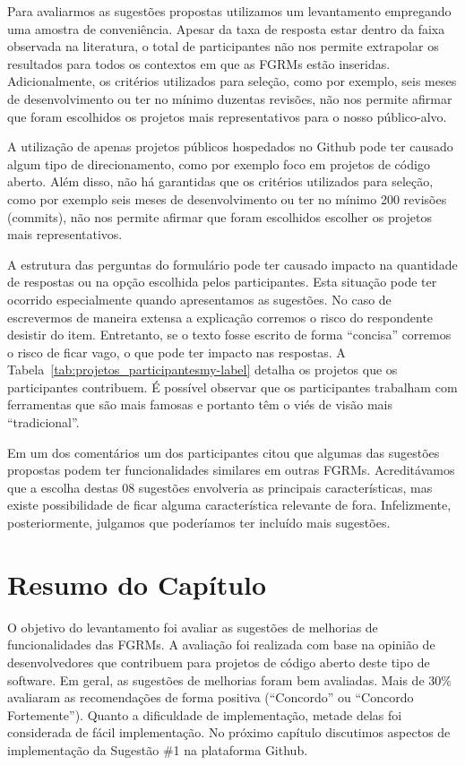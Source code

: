 Para avaliarmos as sugestões propostas utilizamos um levantamento empregando uma
amostra de conveniência. Apesar da taxa de resposta estar dentro da faixa
observada na literatura, o total de participantes não nos permite extrapolar os
resultados para todos os contextos em que as FGRMs estão inseridas.
Adicionalmente, os critérios utilizados para seleção, como por exemplo, seis
meses de desenvolvimento ou ter no mínimo duzentas revisões, não nos permite
afirmar que foram escolhidos os projetos mais representativos para o nosso
público-alvo.

A utilização de apenas projetos públicos hospedados no Github pode ter causado
algum tipo de direcionamento, como por exemplo foco em projetos de código
aberto. Além disso, não há garantidas que os critérios utilizados para seleção,
como por exemplo seis meses de desenvolvimento ou ter no mínimo 200 revisões
(commits), não nos permite afirmar que foram escolhidos escolher os projetos
mais representativos.

A estrutura das perguntas do formulário pode ter causado impacto na quantidade
de respostas ou na opção escolhida pelos participantes. Esta situação pode ter
ocorrido especialmente quando apresentamos as sugestões. No caso de escrevermos
de maneira extensa a explicação corremos o risco do respondente desistir do
item. Entretanto, se o texto fosse escrito de forma ``concisa'' corremos o risco
de ficar vago, o que pode ter impacto nas respostas. A
Tabela~\ref{tab:projetos_participantesmy-label} detalha os projetos que os
participantes contribuem. É possível observar que os participantes trabalham com
ferramentas que são mais famosas e portanto têm o viés de visão mais
``tradicional''.

Em um dos comentários um dos participantes citou que algumas das sugestões
propostas podem ter funcionalidades similares em outras FGRMs. Acreditávamos que
a escolha destas 08 sugestões envolveria as principais características, mas
existe possibilidade de ficar alguma característica relevante de fora.
Infelizmente, posteriormente, julgamos que poderíamos ter incluído mais
sugestões.

\section{Resumo do Capítulo}
\label{sec:sug_melhoria_resumo}

O objetivo do levantamento foi avaliar as sugestões de melhorias de
funcionalidades das FGRMs. A avaliação foi realizada com base na opinião de
desenvolvedores que contribuem para projetos de código aberto deste tipo de
software. Em geral, as sugestões de melhorias foram bem avaliadas. Mais de 30\%
avaliaram as recomendações de forma positiva (``Concordo'' ou  ``Concordo
Fortemente''). Quanto a dificuldade de implementação, metade delas foi
considerada de fácil implementação. No próximo capítulo discutimos aspectos de
implementação da Sugestão \#1 na plataforma Github.
